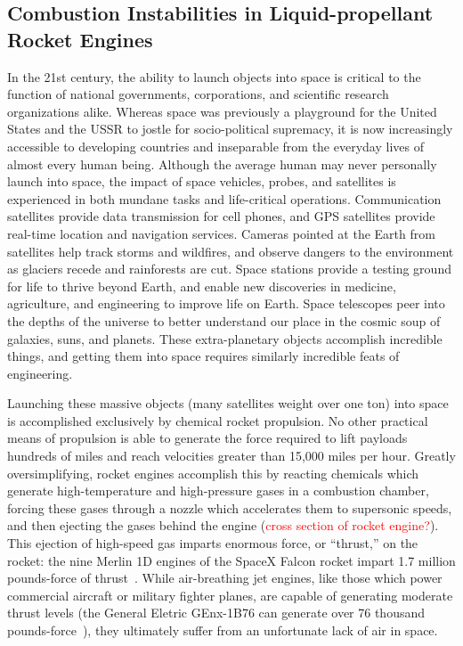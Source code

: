 \subsection{Combustion Instabilities in Liquid-propellant Rocket Engines}

In the 21st century, the ability to launch objects into space is critical to the function of national governments, corporations, and scientific research organizations alike. Whereas space was previously a playground for the United States and the USSR to jostle for socio-political supremacy, it is now increasingly accessible to developing countries and inseparable from the everyday lives of almost every human being. Although the average human may never personally launch into space, the impact of space vehicles, probes, and satellites is experienced in both mundane tasks and life-critical operations. Communication satellites provide data transmission for cell phones, and GPS satellites provide real-time location and navigation services. Cameras pointed at the Earth from satellites help track storms and wildfires, and observe dangers to the environment as glaciers recede and rainforests are cut. Space stations provide a testing ground for life to thrive beyond Earth, and enable new discoveries in medicine, agriculture, and engineering to improve life on Earth. Space telescopes peer into the depths of the universe to better understand our place in the cosmic soup of galaxies, suns, and planets. These extra-planetary objects accomplish incredible things, and getting them into space requires similarly incredible feats of engineering.

Launching these massive objects (many satellites weight over one ton) into space is accomplished exclusively by chemical rocket propulsion. No other practical means of propulsion is able to generate the force required to lift payloads hundreds of miles and reach velocities greater than 15,000 miles per hour. Greatly oversimplifying, rocket engines accomplish this by reacting chemicals which generate high-temperature and high-pressure gases in a combustion chamber, forcing these gases through a nozzle which accelerates them to supersonic speeds, and then ejecting the gases behind the engine (\textcolor{red}{cross section of rocket engine?}). This ejection of high-speed gas imparts enormous force, or ``thrust,'' on the rocket: the nine Merlin 1D engines of the SpaceX Falcon rocket impart 1.7 million pounds-force of thrust~\cite{falconGuide}. While air-breathing jet engines, like those which power commercial aircraft or military fighter planes, are capable of generating moderate thrust levels (the General Eletric GEnx-1B76 can generate over 76 thousand pounds-force~\cite{genxSpecs}), they ultimately suffer from an unfortunate lack of air in space.

